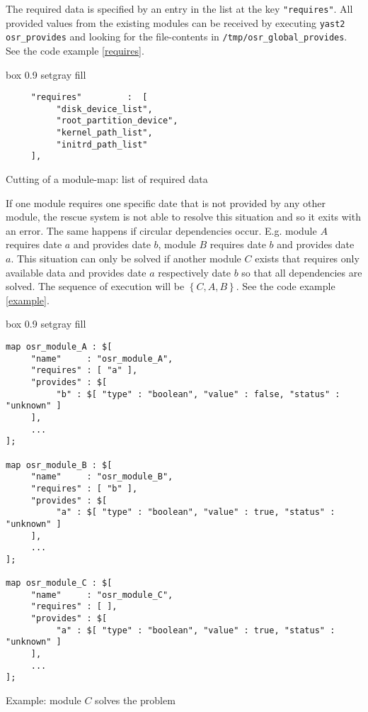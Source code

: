 The required data is specified by an entry in the list at the key
\verb+"requires"+. All provided values from the existing modules can be
received by executing \verb+yast2 osr_provides+ and looking for the
file-contents in \verb+/tmp/osr_global_provides+. See the code example
\ref{requires}.\\

\begin{program}[h!]
\begin{boxitpara}{box 0.9 setgray fill}
{\footnotesize \begin{verbatim}
     "requires"         :  [
          "disk_device_list",
          "root_partition_device",
          "kernel_path_list",
          "initrd_path_list"
     ],
\end{verbatim}}
\end{boxitpara}
\caption{Cutting of a module-map: list of required data}
\label{requires}
\end{program}

If one module requires one specific date that is not provided by any
other module, the rescue system is not able to resolve this situation
and so it exits with an error. The same happens if circular dependencies
occur. E.g. module $A$ requires date $a$ and provides date $b$, module
$B$ requires date $b$ and provides date $a$. This situation can only be
solved if another module $C$ exists that requires only available data
and provides date $a$ respectively date $b$ so that all dependencies
are solved. The sequence of execution will be $\left\{ C, A, B \right\}$.
See the code example \ref{example}.\\

\begin{program}[h!]
\begin{boxitpara}{box 0.9 setgray fill}
{\footnotesize \begin{verbatim}
map osr_module_A : $[
     "name"     : "osr_module_A",
     "requires" : [ "a" ],
     "provides" : $[ 
          "b" : $[ "type" : "boolean", "value" : false, "status" : "unknown" ]
     ],
     ...
];

map osr_module_B : $[
     "name"     : "osr_module_B",
     "requires" : [ "b" ],
     "provides" : $[ 
          "a" : $[ "type" : "boolean", "value" : true, "status" : "unknown" ]
     ],
     ...
];

map osr_module_C : $[
     "name"     : "osr_module_C",
     "requires" : [ ],
     "provides" : $[ 
          "a" : $[ "type" : "boolean", "value" : true, "status" : "unknown" ]
     ],
     ...
];
\end{verbatim}}%
\end{boxitpara}
\caption{Example: module $C$ solves the problem}
\label{example}
\end{program}

